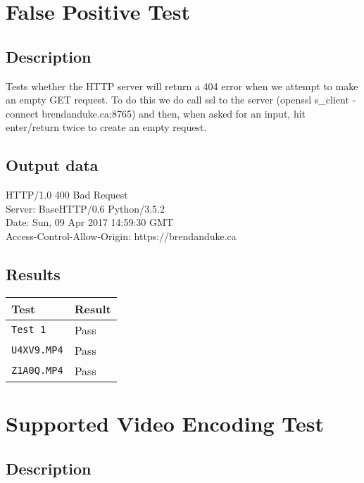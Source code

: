 \documentclass{scrreprt}
\begin{document}
\section{False Positive Test}
\subsection{Description}

Tests whether the HTTP server will return a 404 error when we attempt to make an empty GET request. To do this we do call ssl to the server (openssl s_client -connect brendanduke.ca:8765) and then, when asked for an input, hit enter/return twice to create an empty request.

\subsection{Output data}
HTTP/1.0 400 Bad Request \\
Server: BaseHTTP/0.6 Python/3.5.2 \\
Date: Sun, 09 Apr 2017 14:59:30 GMT \\
Access-Control-Allow-Origin: https://brendanduke.ca \\

\subsection{Results}

\begin{table}[H]
        \centering
        \begin{tabular}{||p{2.5cm}|p{2.5cm}||}
                \hline
                \textbf Test & \textbf Result\\
                \hline\hline
                \verb|Test 1|  &  Pass\\ %
                \hline
                \verb|U4XV9.MP4|  &  Pass\\
                \hline
                \verb|Z1A0Q.MP4| & Pass\\
                \hline
        \end{tabular}
\end{table}


\section{Supported Video Encoding Test}

\subsection{Description}
\end{document}

